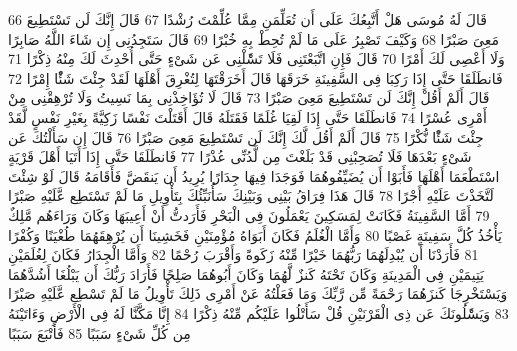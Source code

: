 \documentclass[20pt,a4paper]{article}
\begin{document}
{\tiny\colorbox{cl_aya}{66}} قَالَ لَهُ مُوسَى هَلْ أَتَّبِعُكَ عَلَى أَن تُعَلِّمَنِ مِمَّا عُلِّمْتَ رُشْدًا
{\tiny\colorbox{cl_aya}{67}} قَالَ إِنَّكَ لَن تَسْتَطِيعَ مَعِىَ صَبْرًا
{\tiny\colorbox{cl_aya}{68}} وَكَيْفَ تَصْبِرُ عَلَى مَا لَمْ تُحِطْ بِهِ خُبْرًا
{\tiny\colorbox{cl_aya}{69}} قَالَ سَتَجِدُنِى إِن شَاءَ اللَّهُ صَابِرًا وَلَا أَعْصِى لَكَ أَمْرًا
{\tiny\colorbox{cl_aya}{70}} قَالَ فَإِنِ اتَّبَعْتَنِى فَلَا تَسَْٔلْنِى عَن شَىْءٍ حَتَّى أُحْدِثَ لَكَ مِنْهُ ذِكْرًا
{\tiny\colorbox{cl_aya}{71}} فَانطَلَقَا حَتَّى إِذَا رَكِبَا فِى السَّفِينَةِ خَرَقَهَا قَالَ أَخَرَقْتَهَا لِتُغْرِقَ أَهْلَهَا لَقَدْ جِئْتَ شَئًْا إِمْرًا
{\tiny\colorbox{cl_aya}{72}} قَالَ أَلَمْ أَقُلْ إِنَّكَ لَن تَسْتَطِيعَ مَعِىَ صَبْرًا
{\tiny\colorbox{cl_aya}{73}} قَالَ لَا تُؤَاخِذْنِى بِمَا نَسِيتُ وَلَا تُرْهِقْنِى مِنْ أَمْرِى عُسْرًا
{\tiny\colorbox{cl_aya}{74}} فَانطَلَقَا حَتَّى إِذَا لَقِيَا غُلَمًا فَقَتَلَهُ قَالَ أَقَتَلْتَ نَفْسًا زَكِيَّةً بِغَيْرِ نَفْسٍ لَّقَدْ جِئْتَ شَئًْا نُّكْرًا
{\tiny\colorbox{cl_aya}{75}} قَالَ أَلَمْ أَقُل لَّكَ إِنَّكَ لَن تَسْتَطِيعَ مَعِىَ صَبْرًا
{\tiny\colorbox{cl_aya}{76}} قَالَ إِن سَأَلْتُكَ عَن شَىْءٍ بَعْدَهَا فَلَا تُصَحِبْنِى قَدْ بَلَغْتَ مِن لَّدُنِّى عُذْرًا
{\tiny\colorbox{cl_aya}{77}} فَانطَلَقَا حَتَّى إِذَا أَتَيَا أَهْلَ قَرْيَةٍ اسْتَطْعَمَا أَهْلَهَا فَأَبَوْا أَن يُضَيِّفُوهُمَا فَوَجَدَا فِيهَا جِدَارًا يُرِيدُ أَن يَنقَضَّ فَأَقَامَهُ قَالَ لَوْ شِئْتَ لَتَّخَذْتَ عَلَيْهِ أَجْرًا
{\tiny\colorbox{cl_aya}{78}} قَالَ هَذَا فِرَاقُ بَيْنِى وَبَيْنِكَ سَأُنَبِّئُكَ بِتَأْوِيلِ مَا لَمْ تَسْتَطِع عَّلَيْهِ صَبْرًا
{\tiny\colorbox{cl_aya}{79}} أَمَّا السَّفِينَةُ فَكَانَتْ لِمَسَكِينَ يَعْمَلُونَ فِى الْبَحْرِ فَأَرَدتُّ أَنْ أَعِيبَهَا وَكَانَ وَرَاءَهُم مَّلِكٌ يَأْخُذُ كُلَّ سَفِينَةٍ غَصْبًا
{\tiny\colorbox{cl_aya}{80}} وَأَمَّا الْغُلَمُ فَكَانَ أَبَوَاهُ مُؤْمِنَيْنِ فَخَشِينَا أَن يُرْهِقَهُمَا طُغْيَنًا وَكُفْرًا
{\tiny\colorbox{cl_aya}{81}} فَأَرَدْنَا أَن يُبْدِلَهُمَا رَبُّهُمَا خَيْرًا مِّنْهُ زَكَوةً وَأَقْرَبَ رُحْمًا
{\tiny\colorbox{cl_aya}{82}} وَأَمَّا الْجِدَارُ فَكَانَ لِغُلَمَيْنِ يَتِيمَيْنِ فِى الْمَدِينَةِ وَكَانَ تَحْتَهُ كَنزٌ لَّهُمَا وَكَانَ أَبُوهُمَا صَلِحًا فَأَرَادَ رَبُّكَ أَن يَبْلُغَا أَشُدَّهُمَا وَيَسْتَخْرِجَا كَنزَهُمَا رَحْمَةً مِّن رَّبِّكَ وَمَا فَعَلْتُهُ عَنْ أَمْرِى ذَلِكَ تَأْوِيلُ مَا لَمْ تَسْطِع عَّلَيْهِ صَبْرًا
{\tiny\colorbox{cl_aya}{83}} وَيَسَْٔلُونَكَ عَن ذِى الْقَرْنَيْنِ قُلْ سَأَتْلُوا عَلَيْكُم مِّنْهُ ذِكْرًا
{\tiny\colorbox{cl_aya}{84}} إِنَّا مَكَّنَّا لَهُ فِى الْأَرْضِ وَءَاتَيْنَهُ مِن كُلِّ شَىْءٍ سَبَبًا
{\tiny\colorbox{cl_aya}{85}} فَأَتْبَعَ سَبَبًا
\end{document}
